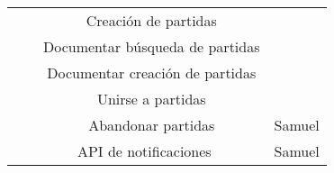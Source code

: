 \documentclass[11pt, a4paper, titlepage]{article}
\begin{document}
\begin{landscape}
\begin{table}[hbt!]
\begin{tabular}{c|cc|c|}
\multicolumn{1}{|c|}{}                             & \multicolumn{1}{c|}{}                                                                                                          & Creación de partidas                                                                                                                                                                             &                                     \\ \cline{3-3}
\multicolumn{1}{|c|}{}                             & \multicolumn{1}{c|}{}                                                                                                          & Documentar búsqueda de partidas                                                                                                                                                                  &                                     \\ \cline{3-3}
\multicolumn{1}{|c|}{}                             & \multicolumn{1}{c|}{}                                                                                                          & Documentar creación de partidas                                                                                                                                                                  &                                     \\ \cline{3-3}
\multicolumn{1}{|c|}{}                             & \multicolumn{1}{c|}{}                                                                                                          & Unirse a partidas                                                                                                                                                                                &                                     \\ \cline{3-4}
\multicolumn{1}{|c|}{}                             & \multicolumn{1}{c|}{}                                                                                                          & Abandonar partidas                                                                                                                                                                               & Samuel                              \\ \cline{2-4}
\multicolumn{1}{|c|}{}                             & \multicolumn{2}{c|}{API de notificaciones}                                                                                                                                                                                                                                                                                        & Samuel                              \\ \cline{2-4}

\end{tabular}
\end{table}
\end{landscape}
\end{document}
